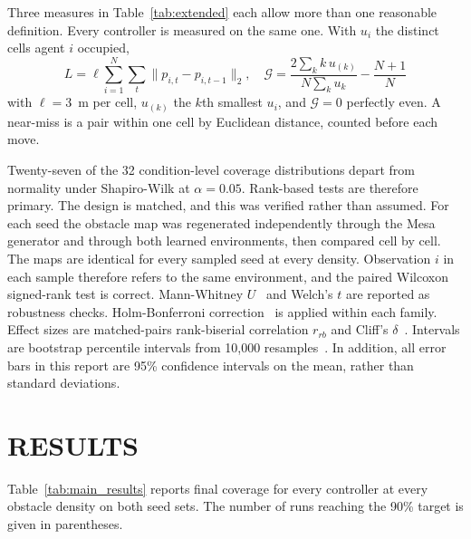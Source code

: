 \documentclass[a4paper, 10pt, conference]{ieeeconf}
\begin{document}
Three measures in Table~\ref{tab:extended} each allow more than one
reasonable definition. Every controller is measured on the same one.
With $u_i$ the distinct cells agent $i$ occupied,
\begin{equation}\label{eq:secondary}
L=\ell\!\!\sum_{i=1}^{N}\sum_{t}\lVert p_{i,t}-p_{i,t-1}\rVert_2,
\quad
\mathcal{G}=\frac{2\sum_{k} k\,u_{(k)}}{N\sum_{k}u_{k}}-\frac{N{+}1}{N}
\end{equation}
with $\ell=3$~m per cell, $u_{(k)}$ the $k$th smallest $u_i$, and
$\mathcal{G}=0$ perfectly even. A near-miss is a pair within one cell
by Euclidean distance, counted before each move.

Twenty-seven of the 32 condition-level coverage distributions depart
from normality under Shapiro-Wilk at $\alpha = 0.05$. Rank-based tests
are therefore primary. The design is matched, and this was verified
rather than assumed. For each seed the obstacle map was regenerated
independently through the Mesa generator and through both learned
environments, then compared cell by cell. The maps are identical for
every sampled seed at every density. Observation $i$ in each sample
therefore refers to the same environment, and the paired Wilcoxon
signed-rank test is correct. Mann-Whitney $U$~\cite{mann1947} and
Welch's $t$ are reported as robustness checks. Holm-Bonferroni
correction~\cite{holm1979} is applied within each family. Effect sizes
are matched-pairs rank-biserial correlation $r_{rb}$ and Cliff's
$\delta$~\cite{cliff1993}. Intervals are bootstrap percentile
intervals from 10{,}000 resamples~\cite{efron1979}. In addition, all
error bars in this report are 95\% confidence intervals on the mean,
rather than standard deviations.

\section{RESULTS}\label{sec:results}

Table~\ref{tab:main_results} reports final coverage for every
controller at every obstacle density on both seed sets. The number of
runs reaching the 90\% target is given in parentheses.
\end{document}
